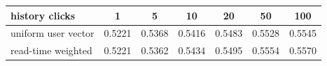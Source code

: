 \begin{tabular}{@{}lcccccc@{}}
\toprule
history clicks & 1 & 5 & 10 & 20 & 50 & 100 \\
\midrule
uniform user vector & 0.5221 & 0.5368 & 0.5416 & 0.5483 & 0.5528 & 0.5545 \\
read-time weighted & 0.5221 & 0.5362 & 0.5434 & 0.5495 & 0.5554 & 0.5570 \\
\bottomrule
\end{tabular}
